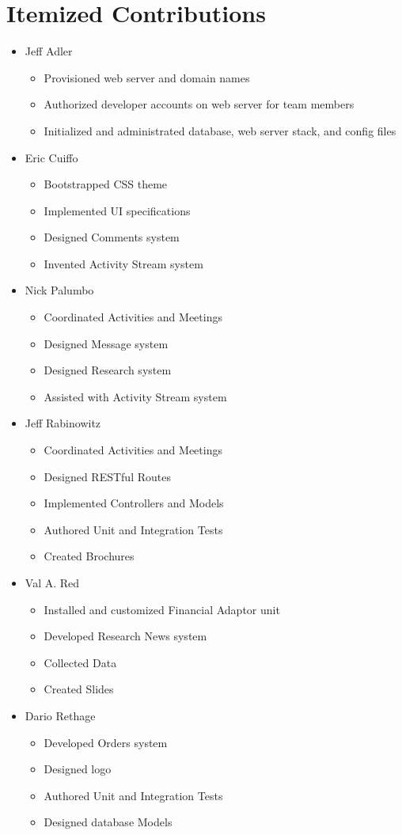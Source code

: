 \section{Itemized Contributions}

\begin{itemize}
\item Jeff Adler
	\begin{itemize}
	\item Provisioned web server and domain names
	\item Authorized developer accounts on web server for team members
	\item Initialized and administrated database, web server stack, and config files
	\end{itemize}
\item Eric Cuiffo
	\begin{itemize}
	\item Bootstrapped CSS theme
	\item Implemented UI specifications
	\item Designed Comments system
	\item Invented Activity Stream system
	\end{itemize}
\item Nick Palumbo
	\begin{itemize}
	\item Coordinated Activities and Meetings
	\item Designed Message system
	\item Designed Research system
	\item Assisted with Activity Stream system
	\end{itemize}
\item Jeff Rabinowitz
	\begin{itemize}
	\item Coordinated Activities and Meetings
	\item Designed RESTful Routes
	\item Implemented Controllers and Models
	\item Authored Unit and Integration Tests
	\item Created Brochures
	\end{itemize}
\item Val A. Red
	\begin{itemize}
	\item Installed and customized Financial Adaptor unit
	\item Developed Research News system
	\item Collected Data
	\item Created Slides
	\end{itemize}
\item Dario Rethage
	\begin{itemize}
	\item Developed Orders system
	\item Designed logo
	\item Authored Unit and Integration Tests
	\item Designed database Models
	\end{itemize}
\end{itemize}